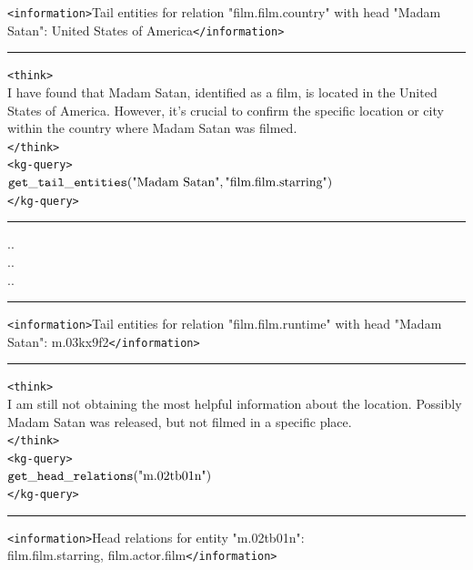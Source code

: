 \begin{table}[H]
\begin{reasonbox}[title=\framework{} Response Example - \dataset{SimpleQA}]
\texttt{<information>}Tail entities for relation "film.film.country" with head "Madam Satan": United States of America\texttt{</information>}

\vspace{0.5em}\hrule\vspace{0.5em}

\begin{blueblock}
\texttt{<think>} \\
I have found that Madam Satan, identified as a film, is located in the United States of America. However, it's crucial to confirm the specific location or city within the country where Madam Satan was filmed. \\
\texttt{</think>} \\
\texttt{<kg-query>} \\
$\mathtt{get\_tail\_entities}(\text{"Madam Satan"}, \text{"film.film.starring"})$ \\
\texttt{</kg-query>}
\end{blueblock}

\vspace{0.5em}\hrule\vspace{0.5em}
..\\
..\\
..
\vspace{0.5em}\hrule\vspace{0.5em}

\texttt{<information>}Tail entities for relation "film.film.runtime" with head "Madam Satan": m.03kx9f2\texttt{</information>}

\vspace{0.5em}\hrule\vspace{0.5em}

\begin{blueblock}
\texttt{<think>} \\
I am still not obtaining the most helpful information about the location. Possibly Madam Satan was released, but not filmed in a specific place. \\
\texttt{</think>} \\
\texttt{<kg-query>} \\
$\mathtt{get\_head\_relations}(\text{"m.02tb01n"})$ \\
\texttt{</kg-query>}
\end{blueblock}

\vspace{0.5em}\hrule\vspace{0.5em}

\texttt{<information>}Head relations for entity "m.02tb01n": \\
film.film.starring, film.actor.film\texttt{</information>}


\end{reasonbox}
\end{table}
